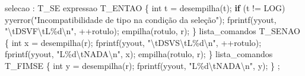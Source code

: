 \documentclass[
  brazilian,
  letterpaper,
]{book}
\newenvironment{Shaded}{\begin{snugshade}}{\end{snugshade}}
\newcommand{\CharTok}[1]{\textcolor[rgb]{0.13,0.47,0.30}{#1}}
\newcommand{\ControlFlowTok}[1]{\textcolor[rgb]{0.00,0.23,0.31}{\textbf{#1}}}
\newcommand{\DataTypeTok}[1]{\textcolor[rgb]{0.68,0.00,0.00}{#1}}
\newcommand{\NormalTok}[1]{\textcolor[rgb]{0.00,0.23,0.31}{#1}}
\newcommand{\OperatorTok}[1]{\textcolor[rgb]{0.37,0.37,0.37}{#1}}
\newcommand{\SpecialCharTok}[1]{\textcolor[rgb]{0.37,0.37,0.37}{#1}}
\newcommand{\StringTok}[1]{\textcolor[rgb]{0.13,0.47,0.30}{#1}}
\theoremstyle{plain}
\theoremstyle{definition}
\theoremstyle{remark}
\begin{document}
\begin{Shaded}
\begin{Highlighting}[]
\NormalTok{selecao}
    \OperatorTok{:}\NormalTok{ T\_SE expressao T\_ENTAO}
        \OperatorTok{\{} 
            \DataTypeTok{int}\NormalTok{ t }\OperatorTok{=}\NormalTok{ desempilha}\OperatorTok{(}\CharTok{\textquotesingle{}t\textquotesingle{}}\OperatorTok{);}
            \ControlFlowTok{if} \OperatorTok{(}\NormalTok{t }\OperatorTok{!=}\NormalTok{ LOG}\OperatorTok{)}
\NormalTok{                yyerror}\OperatorTok{(}\StringTok{"Incompatibilidade de tipo na condição da seleção"}\OperatorTok{);}
\NormalTok{            fprintf}\OperatorTok{(}\NormalTok{yyout}\OperatorTok{,} \StringTok{"}\SpecialCharTok{\textbackslash{}t}\StringTok{DSVF}\SpecialCharTok{\textbackslash{}t}\StringTok{L}\SpecialCharTok{\%d\textbackslash{}n}\StringTok{"}\OperatorTok{,} \OperatorTok{++}\NormalTok{rotulo}\OperatorTok{);}
\NormalTok{            empilha}\OperatorTok{(}\NormalTok{rotulo}\OperatorTok{,} \CharTok{\textquotesingle{}r\textquotesingle{}}\OperatorTok{);} 
        \OperatorTok{\}} 
\NormalTok{      lista\_comandos T\_SENAO }
        \OperatorTok{\{} 
            \DataTypeTok{int}\NormalTok{ x }\OperatorTok{=}\NormalTok{ desempilha}\OperatorTok{(}\CharTok{\textquotesingle{}r\textquotesingle{}}\OperatorTok{);}
\NormalTok{            fprintf}\OperatorTok{(}\NormalTok{yyout}\OperatorTok{,} \StringTok{"}\SpecialCharTok{\textbackslash{}t}\StringTok{DSVS}\SpecialCharTok{\textbackslash{}t}\StringTok{L}\SpecialCharTok{\%d\textbackslash{}n}\StringTok{"}\OperatorTok{,} \OperatorTok{++}\NormalTok{rotulo}\OperatorTok{);}
\NormalTok{            fprintf}\OperatorTok{(}\NormalTok{yyout}\OperatorTok{,} \StringTok{"L}\SpecialCharTok{\%d\textbackslash{}t}\StringTok{NADA}\SpecialCharTok{\textbackslash{}n}\StringTok{"}\OperatorTok{,}\NormalTok{ x}\OperatorTok{);}
\NormalTok{            empilha}\OperatorTok{(}\NormalTok{rotulo}\OperatorTok{,} \CharTok{\textquotesingle{}r\textquotesingle{}}\OperatorTok{);}
        \OperatorTok{\}}
\NormalTok{      lista\_comandos T\_FIMSE}
        \OperatorTok{\{} 
            \DataTypeTok{int}\NormalTok{ y }\OperatorTok{=}\NormalTok{ desempilha}\OperatorTok{(}\CharTok{\textquotesingle{}r\textquotesingle{}}\OperatorTok{);}
\NormalTok{            fprintf}\OperatorTok{(}\NormalTok{yyout}\OperatorTok{,} \StringTok{"L}\SpecialCharTok{\%d\textbackslash{}t}\StringTok{NADA}\SpecialCharTok{\textbackslash{}n}\StringTok{"}\OperatorTok{,}\NormalTok{ y}\OperatorTok{);} 
        \OperatorTok{\}}
    \OperatorTok{;}
\end{Highlighting}
\end{Shaded}
\end{document}
